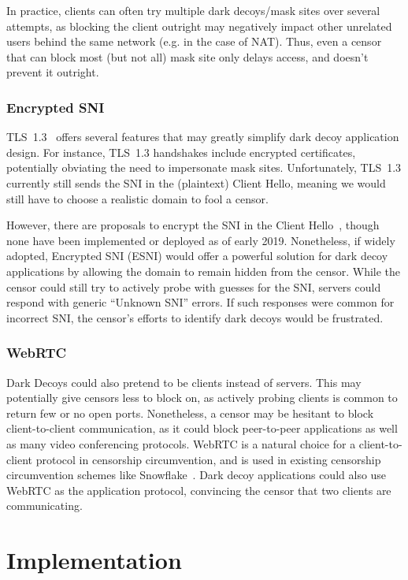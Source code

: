 \documentclass[letterpaper,twocolumn,10pt]{article}
\begin{document}
In practice, clients can often try multiple dark decoys/mask sites over
several attempts, as blocking the client outright may negatively impact other
unrelated users behind the same network (e.g. in the case of NAT). Thus, even a
censor that can block most (but not all) mask site only delays access, and
doesn't prevent it outright.

\subsubsection{Encrypted SNI}
\label{esni}

TLS~1.3~\cite{tls13} offers several features that may greatly simplify dark
decoy application design. For instance, TLS~1.3 handshakes include encrypted
certificates, potentially obviating the need to impersonate mask sites.
Unfortunately, TLS~1.3 currently still sends the SNI in the (plaintext) Client
Hello, meaning we would still have to choose a realistic domain to fool a
censor.

However, there are proposals to encrypt the SNI in the Client Hello~\cite{esni},
though none have been implemented or deployed as of early 2019. Nonetheless,
if widely adopted, Encrypted SNI (ESNI) would offer a powerful solution for dark
decoy applications by allowing the domain to remain hidden from the censor.
While the censor could still try to actively probe with guesses for the SNI,
servers could respond with generic ``Unknown SNI'' errors. If such responses
were common for incorrect SNI, the censor's efforts to identify dark decoys
would be frustrated.

\subsubsection{WebRTC}

Dark Decoys could also pretend to be clients instead of servers. This may
potentially give censors less to block on, as actively probing clients is common
to return few or no open ports. Nonetheless, a censor may be hesitant to block
client-to-client communication, as it could block peer-to-peer applications as
well as many video conferencing protocols. WebRTC is a
natural choice for a client-to-client protocol in censorship circumvention,
and is used in existing censorship circumvention schemes like
Snowflake~\cite{snowflake}. Dark decoy applications could also use WebRTC as the
application protocol, convincing the censor that two clients are communicating.

\section{Implementation}
\end{document}
